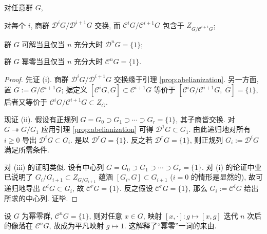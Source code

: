 \begin{lemma}\label{prop:solvable-nilpotent-characterization}
	对任意群 $G$,
	\begin{compactenum}[(i)]
		\item 对每个 $i$, 商群 $\mathscr{D}^i G/\mathscr{D}^{i+1} G$ 交换, 而 $\mathscr{C}^i G/\mathscr{C}^{i+1} G$ 包含于 $Z_{G/\mathscr{C}^{i+1} G}$;
		\item 群 $G$ 可解当且仅当 $n$ 充分大时 $\mathscr{D}^n G = \{1\}$;
		\item 群 $G$ 幂零当且仅当 $n$ 充分大时 $\mathscr{C}^n G = \{1\}$.
	\end{compactenum}
\end{lemma}
\begin{proof}
	先证 (i). 商群 $\mathscr{D}^i G/\mathscr{D}^{i+1} G$ 交换缘于引理 \ref{prop:abelianization}. 另一方面, 置 $\bar{G} := G/\mathscr{C}^{i+1}G$; 据定义 $[\mathscr{C}^i G, G] \subset \mathscr{C}^{i+1}G$ 等价于 $[\mathscr{C}^i G/\mathscr{C}^{i+1} G, \;\bar{G}] = \{1\}$, 后者又等价于 $\mathscr{C}^i G/\mathscr{C}^{i+1} G \subset Z_{\bar{G}}$.

	现证 (ii). 假设有正规列 $G = G_0 \supset G_1 \supset \cdots \supset G_r = \{1\}$, 其子商皆交换. 对 $G \twoheadrightarrow G/G_1$ 应用引理 \ref{prop:abelianization} 可得 $\mathscr{D}^1 G \subset G_1$. 由此递归地对所有 $i \geq 0$ 导出 $\mathscr{D}^i G \subset G_i$. 是以 $\mathscr{D}^r G = \{1\}$. 反之若 $\mathscr{D}^r G = \{1\}$, 则正规列 $G_i := \mathscr{D}^i G$ 满足所需条件.

	对 (iii) 的证明类似. 设有中心列 $G = G_0 \supset G_1 \supset \cdots \supset G_r = \{1\}$. 对 (i) 的论证中业已说明了 $G_i/G_{i+1} \subset Z_{G/G_{i+1}}$ 蕴涵 $[G_i, G] \subset G_{i+1}$ ($i=0$ 的情形是显然的), 故可递归地导出 $\mathscr{C}^i G \subset G_i$, 故 $\mathscr{C}^r G = \{1\}$. 反之假设 $\mathscr{C}^r G = \{1\}$, 那么 $G_i := \mathscr{C}^i G$ 给出所求的中心列. 证毕.
\end{proof}

\begin{remark}
	设 $G$ 为幂零群, $\mathscr{C}^n G = \{1\}$, 则对任意 $x \in G$, 映射 $[x, \cdot]: g \mapsto [x, g]$ 迭代 $n$ 次后的像落在 $\mathscr{C}^n G$, 故成为平凡映射 $g \mapsto 1$. 这解释了``幂零''一词的来由.
\end{remark}

